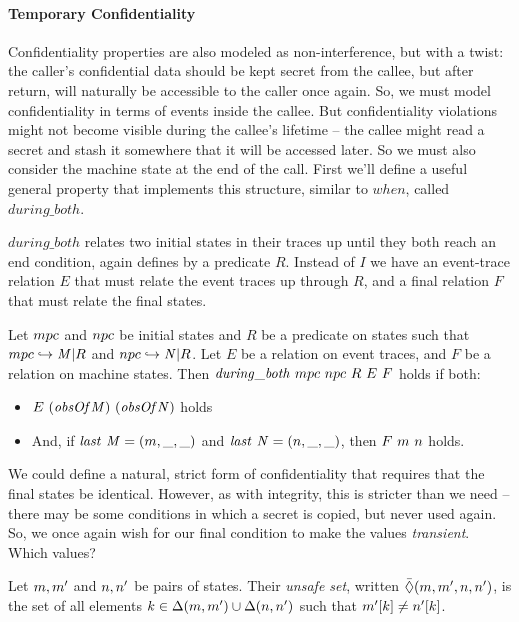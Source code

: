 \documentclass[10pt,conference]{ieeetran}%
\theoremstyle{definition}
\begin{document}
\paragraph*{Temporary Confidentiality}

Confidentiality properties are also modeled as non-interference, but with a twist:
the caller's confidential data should be kept secret from the callee, but after return,
will naturally be accessible to the caller once again. So, we must model confidentiality
in terms of events inside the callee. But confidentiality violations might not become
visible during the callee's lifetime -- the callee might read a secret and stash it somewhere
that it will be accessed later. So we must also consider the machine state at the end
of the call. First we'll define a useful general property that implements this structure,
similar to \(\mathit{when}\), called \(\mathit{during\_both}\).

\(\mathit{during\_both}\) relates two initial states in their traces up until they
both reach an end condition, again defines by a predicate \(R\). Instead of \(I\)
we have an event-trace relation \(E\) that must relate the event traces up through
\(R\), and a final relation \(F\) that must relate the final states.

 Let \(mpc\) and \(npc\) be initial states
and \(R\) be a predicate on states such that
\(mpc \hookrightarrow \mathit{M} | R\) and
\(npc \hookrightarrow \mathit{N} | R\).
Let \(E\) be a relation on event traces, and \(F\) be a relation on machine states.
Then \(\mathit{during\_both} ~ mpc ~ npc ~ R ~ E ~ F\) holds if both:
\begin{itemize}
\item \(E ~ (\mathit{obsOf} \mathit{M}) ~ (\mathit{obsOf} \mathit{N})\) holds
\item And, if \(\mathit{last} ~ \mathit{M} = (m,\_,\_)\) and \(\mathit{last} ~ \mathit{N} = (n,\_,\_)\),
  then \(F ~ m ~ n\) holds.
\end{itemize}

We could define a natural, strict form of confidentiality that requires that the final
states be identical. However, as with integrity, this is stricter than we need -- there
may be some conditions in which a secret is copied, but never used again. So, we once
again wish for our final condition to make the values {\it transient}. Which values?

 Let \(m,m'\) and \(n,n'\)
be pairs of states. Their {\em unsafe set}, written
\(\bar{\Diamond}(m,m',n,n')\), is the set of all elements
\(k \in \Delta(m,m') \cup \Delta(n,n')\) such that
\(m'[k] \not = n'[k]\).
\end{document}
